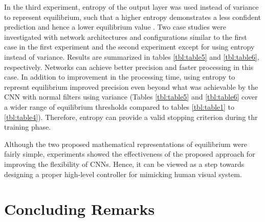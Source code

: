 \documentclass[journal]{IEEEtran}
\begin{document}
In the third experiment, entropy of the output layer was used instead of variance to represent equilibrium, such that a higher entropy demonstrates a less confident prediction and hence a lower equilibrium value \cite{cognitivecontrol2012, fatemi2017observability}. Two case studies were investigated with network architectures and configurations similar to the first case in the first experiment and the second experiment except for using entropy instead of variance. Results are summarized in tables \ref{tbl:table5} and \ref{tbl:table6}, respectively. Networks can achieve better precision and faster processing in this case. In addition to improvement in the processing time, using entropy to represnt equilibrium improved precision even beyond what was achievable by the CNN with normal filters using variance (Tables \ref{tbl:table5} and \ref{tbl:table6} cover a wider range of equilibrium thresholds compared to tables \ref{tbl:table1} to \ref{tbl:table4}). Therefore, entropy can provide a valid stopping criterion during thr training phase. 

Although the two proposed mathematical representations of equilibrium were fairly simple, experiments showed the effectiveness of the proposed approach for improving the flexibility of CNNs. Hence, it can be viewed as a step towards designing a proper high-level controller for mimicking human visual system. 

\section{Concluding Remarks}
\end{document}
